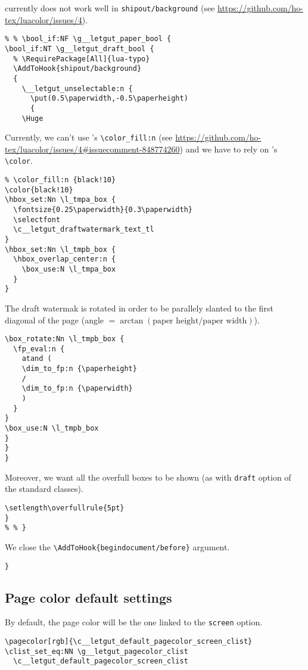 \documentclass{letgut}
\begin{document}
\begin{itemize}
\begin{itemize}
currently does not work well in \lstinline+shipout/background+ (see
\url{https://github.com/ho-tex/luacolor/issues/4}).
\begin{lstlisting}
% % \bool_if:NF \g__letgut_paper_bool {
\bool_if:NT \g__letgut_draft_bool {
  % \RequirePackage[All]{lua-typo}
  \AddToHook{shipout/background}
  {
    \__letgut_unselectable:n {
      \put(0.5\paperwidth,-0.5\paperheight)
      {
	\Huge
\end{lstlisting}
Currently, we can't use 's \lstinline+\color_fill:n+ (see
\url{https://github.com/ho-tex/luacolor/issues/4\#issuecomment-848774260})
and we have to rely on 's \lstinline+\color+.
\begin{lstlisting}
% \color_fill:n {black!10}
\color{black!10}
\hbox_set:Nn \l_tmpa_box {
  \fontsize{0.25\paperwidth}{0.3\paperwidth}
  \selectfont
  \c__letgut_draftwatermark_text_tl
}
\hbox_set:Nn \l_tmpb_box {
  \hbox_overlap_center:n {
    \box_use:N \l_tmpa_box
  }
}
\end{lstlisting}
The draft watermak is rotated in order to be parallely slanted to the first
diagonal of the page (angle \(=\arctan(\text{paper height}/\text{paper
    width})\)).
\begin{lstlisting}
\box_rotate:Nn \l_tmpb_box {
  \fp_eval:n {
    atand (
    \dim_to_fp:n {\paperheight}
    /
    \dim_to_fp:n {\paperwidth}
    )
  }
}
\box_use:N \l_tmpb_box
}
}
}
\end{lstlisting}
	    Moreover, we want all the overfull boxes to be shown (as with
\lstinline+draft+ option of the standard classes).
\begin{lstlisting}
\setlength\overfullrule{5pt}
}
% % }
\end{lstlisting}
\end{itemize}
\end{itemize}

We close the \lstinline+\AddToHook{begindocument/before}+ argument.

\begin{lstlisting}
}
\end{lstlisting}

\subsection{Page color default settings}
\label{ImplementationPagecolordefaultsettings-c1hg55h0jlj0}
By default, the page color will be the one linked to the \lstinline+screen+ option.

\begin{lstlisting}
\pagecolor[rgb]{\c__letgut_default_pagecolor_screen_clist}
\clist_set_eq:NN \g__letgut_pagecolor_clist
  \c__letgut_default_pagecolor_screen_clist
\end{lstlisting}
\end{document}
